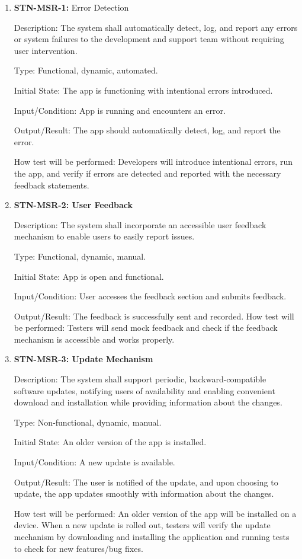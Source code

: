 \documentclass[12pt, titlepage]{article}
\begin{document}
\begin{enumerate}

\item {\textbf{STN-MSR-1:} Error Detection}

Description: The system shall automatically detect, log, and report any errors or system failures to the development and support team without requiring user intervention. 

Type: Functional, dynamic, automated.

Initial State: The app is functioning with intentional errors introduced.

Input/Condition: App is running and encounters an error.

Output/Result: The app should automatically detect, log, and report the error.

How test will be performed: Developers will introduce intentional errors, run the app, and verify if errors are detected and reported with the necessary feedback statements. 


\item{\textbf{STN-MSR-2: User Feedback}}

Description: The system shall incorporate an accessible user feedback mechanism to enable users to easily report issues.

Type: Functional, dynamic, manual.

Initial State: App is open and functional.

Input/Condition: User accesses the feedback section and submits feedback.

Output/Result: The feedback is successfully sent and recorded.
How test will be performed: Testers will send mock feedback and check if the feedback mechanism is accessible and works properly.


\item{\textbf{STN-MSR-3: Update Mechanism}}

Description: The system shall support periodic, backward-compatible software updates, notifying users of availability and enabling convenient download and installation while providing information about the changes.

Type: Non-functional, dynamic, manual.

Initial State: An older version of the app is installed.

Input/Condition: A new update is available.

Output/Result: The user is notified of the update, and upon choosing to update, the app updates smoothly with information about the changes.

How test will be performed: An older version of the app will be installed on a device. When a new update is rolled out, testers will verify the update mechanism by downloading and installing the application and running tests to check for new features/bug fixes. 

\end{enumerate}
\end{document}
